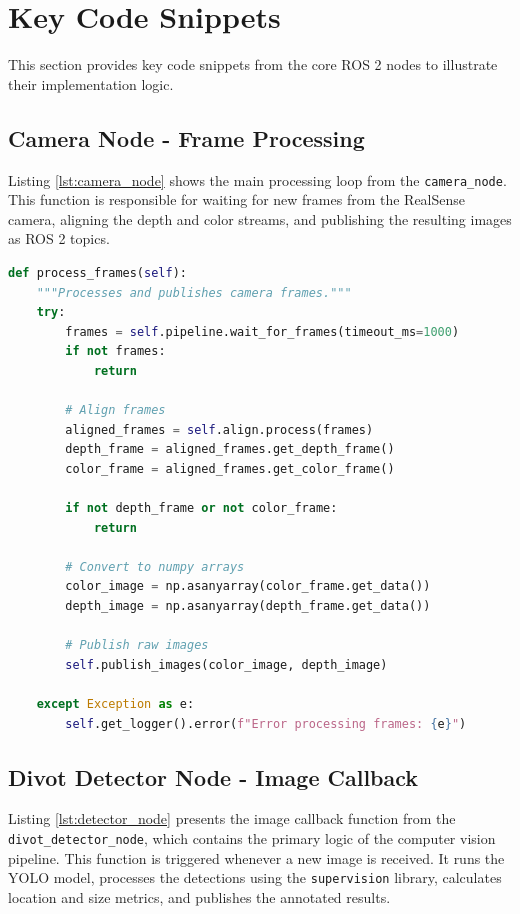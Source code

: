 \cleardoublepage %

\section{Key Code Snippets}
\label{sec:appendix_code}
This section provides key code snippets from the core ROS 2 nodes to illustrate their implementation logic.

\subsection{Camera Node - Frame Processing}
Listing \ref{lst:camera_node} shows the main processing loop from the \texttt{camera\_node}. This function is responsible for waiting for new frames from the RealSense camera, aligning the depth and color streams, and publishing the resulting images as ROS 2 topics.

\begin{lstlisting}[language=Python, caption={Core frame processing logic from \texttt{camera\_node.py}.}, label={lst:camera_node}]
def process_frames(self):
    """Processes and publishes camera frames."""
    try:
        frames = self.pipeline.wait_for_frames(timeout_ms=1000)
        if not frames:
            return
        
        # Align frames
        aligned_frames = self.align.process(frames)
        depth_frame = aligned_frames.get_depth_frame()
        color_frame = aligned_frames.get_color_frame()
        
        if not depth_frame or not color_frame:
            return
            
        # Convert to numpy arrays
        color_image = np.asanyarray(color_frame.get_data())
        depth_image = np.asanyarray(depth_frame.get_data())
        
        # Publish raw images
        self.publish_images(color_image, depth_image)
        
    except Exception as e:
        self.get_logger().error(f"Error processing frames: {e}")
\end{lstlisting}

\subsection{Divot Detector Node - Image Callback}
Listing \ref{lst:detector_node} presents the image callback function from the \texttt{divot\_detector\_node}, which contains the primary logic of the computer vision pipeline. This function is triggered whenever a new image is received. It runs the YOLO model, processes the detections using the \texttt{supervision} library, calculates location and size metrics, and publishes the annotated results.

